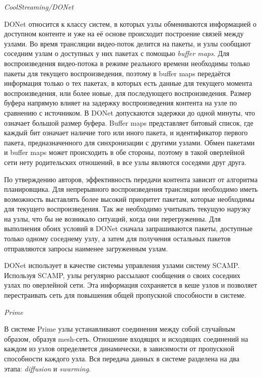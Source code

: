 		\textit{CoolStreaming/DONet}

		DONet относится к классу систем, в которых узлы обмениваются информацией о доступном контенте и уже на её основе
		происходит построение связей между узлами. Во время трансляции видео-поток делится на пакеты, и узлы сообщают
		соседним узлам о доступных у них пакетах с помощью \textit{buffer maps}. Для воспроизведения видео-потока в
		режиме реального времени необходимы только пакеты для текущего воспроизведения, поэтому в buffer maps передаётся
		информация только о тех пакетах, в которых есть данные для текущего момента воспроизведения, или более новые,
		для последующего воспроизведения. Размер буфера напрямую влияет на задержку воспроизведения контента на узле по
		сравнению с источником. В DONet допускаются задержки до одной минуты, что означает большой размер буфера.
		Buffer maps представляет битовый список, где каждый бит означает наличие того или иного пакета, и идентификатор
		первого пакета, предназначенного для синхронизации с другими узлами. Обмен пакетами и buffer maps может
		происходить в обе стороны, поэтому в такой оверлейной сети нету родительских отношений, в все узлы являются
		соседями друг друга.

		По утверждению авторов, эффективность передачи контента зависит от алгоритма планировщика. Для непрерывного
		воспроизведения трансляции необходимо иметь возможность выставлять более высокий приоритет пакетам, которые
		необходимы для текущего воспроизведения. Так же необходимо учитывать текущую нарузку на узлы, что бы не
		возникало ситуаций, когда они перегруженны. Для выполнения обоих условий в DONet сначала запрашиваются пакеты,
		доступные только одному соседнему узлу, а затем для получения остальных пакетов отправляются запросы наименее
		загруженным узлам.

		DONet использует в качестве системы управления узлами систему SCAMP. Используя SCAMP, узлы регулярно рассылают
		сообщения о своих соседних узлах по оверлейной сети. Эта информация сохраняется в кеше узлов и позволяет
		перестраивать сеть для повышения общей пропускной способности в системе.

		\textit{Prime}

		В системе Prime узлы устанавливают соединения между собой случайным образом, образуя mesh-сеть. Отношение
		входящих и исходящих соединений на каждом из узлов определяется динамически, в зависимости от пропускной
		способности каждого узла. Вся передача данных в системе разделена на два этапа: \textit{diffusion} и
		\textit{swarming}.

